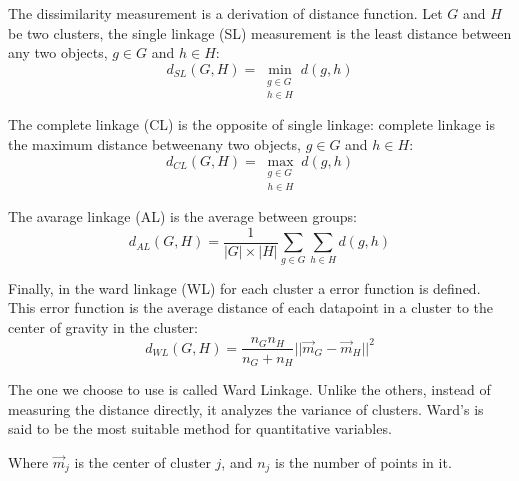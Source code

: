\documentclass[a4paper, 12pt]{article}
\begin{document}
The dissimilarity measurement is a derivation of distance function. Let $G$ and $H$ be two clusters, the single linkage (SL) measurement is the least distance between any two objects, $g \in G$ and $h \in H$:
\begin{equation} \label{eq15}
    d_{SL}(G, H) = \min_{\substack{g \in G \\ h \in H}}d(g,h)
\end{equation}

The complete linkage (CL) is the opposite of single linkage: complete linkage is the maximum distance betweenany two objects, $g \in G$ and $h \in H$:
\begin{equation} \label{eq16}
    d_{CL}(G, H) = \max_{\substack{g \in G \\ h \in H}}d(g,h)
\end{equation}

The avarage linkage (AL) is the average between groups:
\begin{equation} \label{eq17}
    d_{AL}(G, H) = \frac{1}{|G| \times |H|}\sum_{g \in G}\sum_{h \in H}d(g,h)
\end{equation}

Finally, in the ward linkage (WL) for each cluster a error function is defined. This error function is the average distance of each datapoint in a cluster to the center of gravity in the cluster:
\begin{equation} \label{eq18}
    d_{WL}(G, H) = \frac{n_Gn_H}{n_G + n_H}||\vec{m}_G - \vec{m}_H||^2
\end{equation}

The one we choose to use is called Ward Linkage. Unlike the others, instead of measuring the distance directly, it analyzes the variance of clusters. Ward’s is said to be the most suitable method for quantitative variables.

Where $\vec{m}_j$ is the center of cluster $j$, and $n_j$ is the number of points in it.
\end{document}
